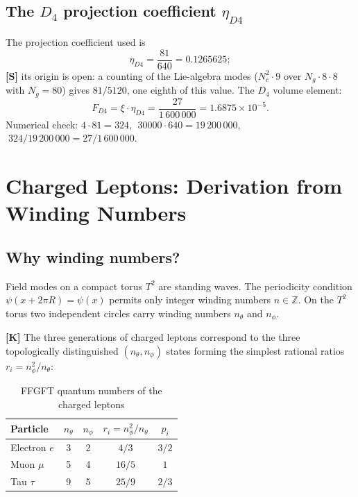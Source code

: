 \subsection{The \texorpdfstring{$D_4$}{D4} projection coefficient
  \texorpdfstring{$\eta_{D4}$}{eta\_D4}}

The projection coefficient used is
\begin{equation}
  \eta_{D4} = \frac{81}{640} = 0.1265625;
  \label{eq:eta_d4}
\end{equation}
\textbf{[S]} its origin is open: a counting of the Lie-algebra modes
($N_c^2\cdot 9$ over $N_g\cdot 8\cdot 8$ with $N_g = 80$) gives
$81/5120$, one eighth of this value. The $D_4$ volume element:
\begin{equation}
  F_{D4} = \xi\cdot\eta_{D4} = \frac{27}{1\,600\,000}
         = 1.6875\times10^{-5}.
  \label{eq:f_d4}
\end{equation}
Numerical check: $4\cdot81 = 324$, $\;30000\cdot640 = 19\,200\,000$,
$\;324/19\,200\,000 = 27/1\,600\,000$. \checkmark

\section{Charged Leptons: Derivation from Winding Numbers}

\subsection{Why winding numbers?}

Field modes on a compact torus $T^2$ are standing waves. The
periodicity condition $\psi(x + 2\pi R) = \psi(x)$ permits only
integer winding numbers $n \in \mathbb{Z}$. On the $T^2$ torus two
independent circles carry winding numbers $n_\theta$ and $n_\phi$.

\textbf{[K]} The three generations of charged leptons correspond to
the three topologically distinguished $(n_\theta, n_\phi)$ states
forming the simplest rational ratios $r_i = n_\phi^2/n_\theta$:

\begin{table}[h]
\centering
\caption{FFGFT quantum numbers of the charged leptons}
\label{tab:winding}
\begin{tabular}{lcccc}
\toprule
Particle & $n_\theta$ & $n_\phi$ & $r_i = n_\phi^2/n_\theta$ & $p_i$ \\
\midrule
Electron $e$  & 3 & 2 & $4/3$  & $3/2$ \\
Muon $\mu$    & 5 & 4 & $16/5$ & $1$   \\
Tau $\tau$    & 9 & 5 & $25/9$ & $2/3$ \\
\bottomrule
\end{tabular}
\end{table}

